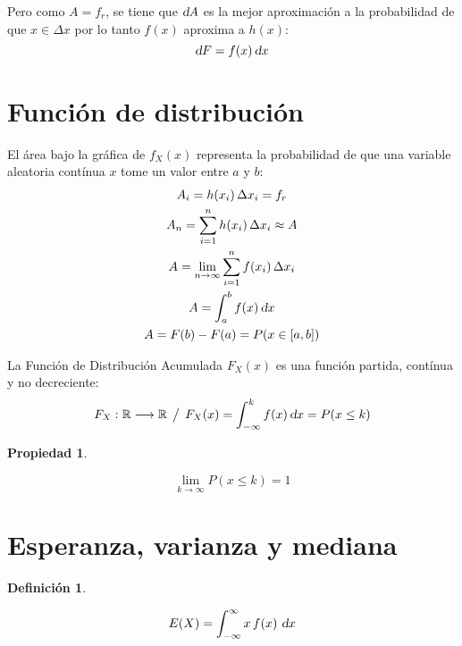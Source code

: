 \documentclass[a5paper,12pt,twoside]{book}
\newtheorem{defn}{{Definición}}[chapter]
\newtheorem{prop}{{Propiedad}}[chapter]
\begin{document}
Pero como $A=f_r$, se tiene que $\textsl{d} A$ es la mejor aproximación a la probabilidad de que $x \in \Delta x$ por lo tanto $f(x)$ aproxima a $h(x)$:
\begin{equation*}
    \textsl{d} F = f(x) \, \textsl{d} x
\end{equation*}


\section{Función de distribución}

El área bajo la gráfica de $f_X(x)$ representa la probabilidad de que una variable aleatoria contínua $x$ tome un valor entre $a$ y $b$:
\begin{gather*}
    A_i = h(x_i) \, \Delta x_i = f_r
    \\
    A_n = \sum_{i=1}^n h(x_i) \, \Delta x_i \approx A
    \\
    A = \lim_{n \to \infty} \sum_{i=1}^n f(x_i) \, \Delta x_i
    \\
    A = \int_a^b f(x) \, \textsl{d} x
    \\
    A = F(b) - F(a) = P(x \in [a,b])
\end{gather*}

La Función de Distribución Acumulada $F_X(x)$ es una función partida, contínua y no decreciente:
\begin{equation*}
    F_X: \mathbb{R} \longrightarrow \mathbb{R} \hspace{1ex} \big/ \hspace{1ex} F_X(x) = \int_{-\infty}^k f(x) \, \textsl{d} x = P(x \leq k)
\end{equation*}

\begin{mdframed}[style=MyFrame1]
    \begin{prop}
    \end{prop}
    \begin{equation*}
        \lim_{k \to \infty} P(x \leq k)=1
    \end{equation*}
\end{mdframed}


\section{Esperanza, varianza y mediana}

\begin{mdframed}[style=MyFrame1]
    \begin{defn}
    \end{defn}
    \begin{equation*}
        E(X) = \int_{-\infty}^{\infty} x \, f \hspace{-0.5mm} \left( x \right) \, \textsl{d} x
    \end{equation*}
\end{mdframed}
\end{document}

